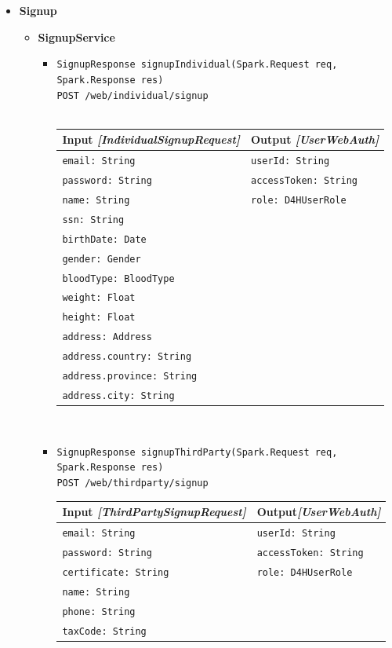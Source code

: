 \documentclass[a4paper, hidelinks, 12pt]{report}
\begin{document}
\begin{itemize}
			\item{\textbf{Signup}}
			\begin{itemize}
				\item{\textbf{SignupService}}
					\begin{itemize}
			\item{\verb|SignupResponse signupIndividual(Spark.Request req, Spark.Response res)|\\ \verb|POST /web/individual/signup|}\\\\
			\begin{tabular}{l | l}
			\textbf{Input} \textit{[IndividualSignupRequest]} & \textbf{Output} \textit{[UserWebAuth]}\\
			\hline
				\verb|email: String| & \verb|userId: String| \\
				\verb|password: String| & \verb|accessToken: String| \\
				\verb|name: String| & \verb|role: D4HUserRole| \\
				\verb|ssn: String| & \\
				\verb|birthDate: Date| & \\
				\verb|gender: Gender| & \\
				\verb|bloodType: BloodType| & \\
				\verb|weight: Float| & \\
				\verb|height: Float| & \\
				\verb|address: Address| & \\
				\verb|address.country: String| & \\
				\verb|address.province: String| & \\
				\verb|address.city: String| & \\
			\end{tabular}\\
			
			\item{\verb|SignupResponse signupThirdParty(Spark.Request req, Spark.Response res)|\\ \verb|POST /web/thirdparty/signup|}\\
			\begin{tabular}{l | l}
			\textbf{Input} \textit{[ThirdPartySignupRequest]} & \textbf{Output}\textit{[UserWebAuth]} \\
			\hline
				\verb|email: String| & \verb|userId: String| \\
				\verb|password: String| & \verb|accessToken: String| \\
				\verb|certificate: String| & \verb|role: D4HUserRole|  \\
				\verb|name: String| & \\
				\verb|phone: String| & \\
				\verb|taxCode: String| & \\
			\end{tabular}\\
		\end{itemize}
		\end{itemize}
			

\end{itemize}
\end{document}
